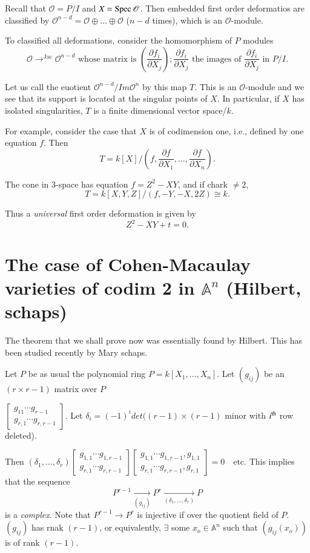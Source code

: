 {Recall that $\mathscr{O}=P/I$ and $X=\operatorname{Spec} \mathscr{O}$. Then embedded first order deformatios are classified by $\mathscr{O}^{n-d}=\mathscr{O}\oplus\ldots \oplus \mathscr{O}$ ($n-d$ times), which is an $\mathscr{O}$-module.

To classified all deformations, consider the homomorphism of $P$ modules
$$
\mathscr{O}\displaystyle\mathop{\rightarrow}^{\text{Jac}}\mathscr{O}^{n-d}\text{ whose matrix is } \left(\frac{\partial f_i}{\partial X_j}\right);\frac{\partial f_i}{\partial X_j} \text{ the images of } \frac{\partial f_i}{\partial X_j} \text{ in } P/I.
$$

Let us call the euotient $\mathscr{O}^{n-d}/Im\mathscr{O}^{n}$ by this map $T$. This is an $\mathscr{O}$-module and we see that its support is located at the singular points of $X$. In particular, if $X$ has isolated singularities, $T$ is a finite dimensional vector space/$k$.

For example, consider the case that $X$ is of codimension one, i.e., defined by one equation $f$. Then
$$
T=k[X]/\left(f, \frac{\partial f}{\partial X_1},\ldots, \frac{\partial f}{\partial X_n}\right).
$$

The cone in 3-space has equation $f=Z^{2}-XY$, and if chark $\neq 2$,
$$
T=k[X, Y, Z]/(f, -Y, -X, 2Z)\cong k.
$$

Thus a {\em universal} first order deformation is given by
$$
Z^{2}-XY+t=0.
$$

\section[The case of Cohen-Macaulay varieties of codim 2...]{The case
of Cohen-Macaulay varieties of codim 2 in 
$\mathbb{A}^{n}$ (Hilbert, schaps)}\label{part1-sec5}\pageoriginale 

The theorem that we shall prove now was essentially found by
Hilbert. This has been studied recently by Mary schaps. 

Let $P$ be as usual the polynomial ring $P=k[X_1,\ldots,X_n]$. Let
$(g_{ij})$ be an $(r\times r-1)$ matrix over $P$ 

$\begin{bmatrix}
g_{11}\cdots g_{r-1}\\
g_{r, 1}\cdots g_{r, r-1}
\end{bmatrix}
$. Let $\delta_{i}=(-1)^{i} det((r-1)\times(r-1)$ minor with $i^{\rm th}$ row deleted).

Then $(\delta_1,\ldots,\delta_{r})\begin{bmatrix}
g_{1,1}\cdots g_{1, r-1}\\
g_{r, 1}\cdots g_{r, r-1}
\end{bmatrix}
\begin{bmatrix}
g_{1, 1}\cdots g_{1, r-1}, g_{1, 1}\\
g_{r, 1}\cdots g_{r, r-1}, g_{r, 1}
\end{bmatrix}=0\quad\text{etc}.
$
This implies that the sequence
$$
P^{r-1}\xrightarrow[(g_{ij})]{}P^{r}\xrightarrow[(\delta_1,\dots,\delta_r)]{}P
$$
is a {\em complex}. Note that $P^{r-1}\rightarrow P^{r}$ is injective
if over the quotient field of $P$. $(g_{ij})$ has rnak $(r-1)$, or
equivalently, $\exists$ some $x_{o}\in \mathbb{A}^{n}$ such that
$(g_{ij}(x_{o}))$ is of rank $(r-1)$. 

}
